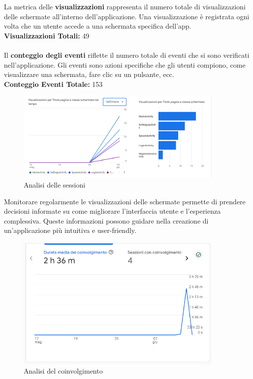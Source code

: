 \documentclass{article}
\begin{document}
		La metrica delle \textbf{visualizzazioni} rappresenta il numero totale di visualizzazioni delle schermate all'interno dell'applicazione. Una visualizzazione è registrata ogni volta che un utente accede a una schermata specifica dell'app.\\
		\textbf{Visualizzazioni Totali:} 49\\
		\\
		Il \textbf{conteggio degli eventi} riflette il numero totale di eventi che si sono verificati nell'applicazione. Gli eventi sono azioni specifiche che gli utenti compiono, come visualizzare una schermata, fare clic su un pulsante, ecc.
		\\
		\textbf{Conteggio Eventi Totale:} 153\\
		\begin{center}
			\begin{figure}[H]
				\centering
				\includegraphics[width=0.9\textwidth]{Immagini/analisisessioni}
				\caption{Analisi delle sessioni}
			\end{figure}
		\end{center}
		Monitorare regolarmente le visualizzazioni delle schermate permette di prendere decisioni informate su come migliorare l'interfaccia utente e l'esperienza complessiva. Queste informazioni possono guidare nella creazione di un'applicazione più intuitiva e user-friendly.\\
		\begin{center}
			\begin{figure}[H]
				\centering
				\includegraphics[width=0.9\textwidth]{Immagini/analisicoinvolgimento}
				\caption{Analisi del coinvolgimento}
			\end{figure}
		\end{center}
\end{document}
